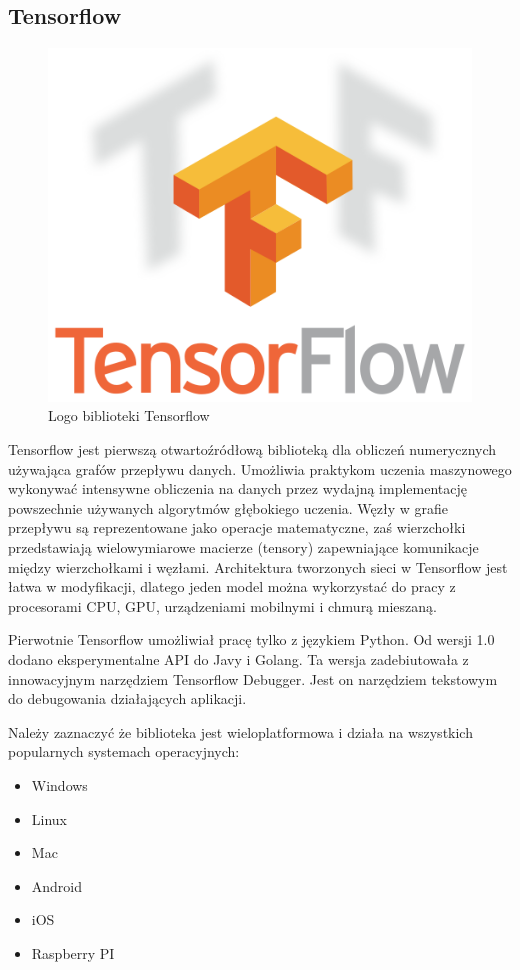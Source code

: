 \documentclass[12pt,a4paper,twoside,titlepage,openright]{book}
\begin{document}
\subsection{Tensorflow}
\begin{figure}[ht]
	\centering
			\includegraphics[resolution=100, scale=0.6]{Tensorflow.png}
		\caption{Logo biblioteki Tensorflow}
\end{figure}

Tensorflow jest pierwszą otwartoźródłową biblioteką dla obliczeń numerycznych używająca grafów przepływu danych. Umożliwia praktykom uczenia maszynowego wykonywać intensywne obliczenia na danych przez wydajną implementację powszechnie używanych algorytmów głębokiego uczenia. Węzły w grafie przepływu są reprezentowane jako operacje matematyczne, zaś wierzchołki przedstawiają wielowymiarowe macierze (tensory) zapewniające komunikacje między wierzchołkami i węzłami. Architektura tworzonych sieci w Tensorflow jest łatwa w modyfikacji, dlatego jeden model można wykorzystać do pracy z procesorami CPU, GPU, urządzeniami mobilnymi i chmurą mieszaną.\cite{DeepLearningTensorflow}

Pierwotnie Tensorflow umożliwiał pracę tylko z językiem Python. Od wersji 1.0 dodano eksperymentalne API do Javy i Golang. Ta wersja zadebiutowała z innowacyjnym narzędziem Tensorflow Debugger. Jest on narzędziem tekstowym do debugowania działających aplikacji.

Należy zaznaczyć że biblioteka jest wieloplatformowa i działa na wszystkich popularnych systemach operacyjnych:
\begin{itemize}
\item Windows
\item Linux
\item Mac
\item Android
\item iOS
\item Raspberry PI
\end{itemize}
\end{document}
